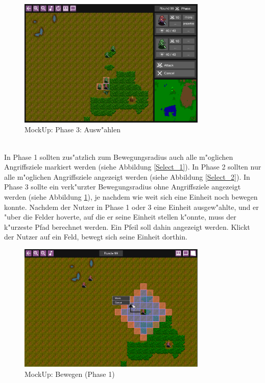 \documentclass[12pt, titlepage]{scrartcl}
\newcounter{subsubsubsection}[subsubsection]
\begin{document}
			        \begin{figure}[H] 
    				    \centering
    				    \includegraphics[width=0.8\textwidth]{images/mockUps/Select3.png}
    				    \caption{MockUp: Phase 3: Ausw"ahlen}
    				    \label{Select_3}
			        \end{figure} 
		            \ \\ In Phase 1 sollten zus"atzlich zum Bewegungsradius auch alle m"oglichen Angriffsziele markiert werden (siehe Abbildung \ref{Select_1}). In Phase 2 sollten nur alle m"oglichen Angriffsziele angezeigt werden (siehe Abbildung \ref{Select_2}). In Phase 3 sollte ein verk"urzter Bewegungsradius ohne Angriffsziele angezeigt werden (siehe Abbildung \ref{Select_3}), je nachdem wie weit sich eine Einheit noch bewegen konnte.
                    Nachdem der Nutzer in Phase 1 oder 3 eine Einheit ausgew"ahlte, und er "uber die Felder hoverte, auf die er seine Einheit stellen k"onnte, muss der k"urzeste Pfad berechnet werden. Ein Pfeil soll dahin angezeigt werden. Klickt der Nutzer auf ein Feld, bewegt sich seine Einheit dorthin. \\
                    \begin{figure}[H] 
    				    \centering
    				    \includegraphics[width=0.8\textwidth]{images/mockUps/Move.png}
    				    \caption{MockUp: Bewegen (Phase 1)}
    				    \label{Move}
			        \end{figure}
\end{document}
